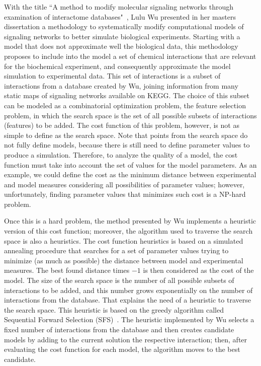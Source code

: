 With the title ``A method to modify molecular signaling networks through
examination of interactome databases"~\cite{Wu15}, Lulu Wu presented in 
her masters dissertation a methodology to systematically modify 
computational models of signaling networks to better simulate biological 
experiments. Starting with a model that does not approximate well the 
biological data, this methodology proposes to include into the model
a set of chemical interactions that are relevant for the biochemical 
experiment, and consequently approximate the model simulation to 
experimental data. This set of interactions is a subset of interactions 
from a database created by Wu, joining information from many static 
maps of signaling networks available on KEGG. The choice of this subset 
can be modeled as a combinatorial optimization problem, the feature 
selection problem, in which the search space is the set of all possible 
subsets of interactions (features) to be added. The cost function of 
this problem, however, is not as simple to define as the search space. 
Note that points from the search space do not fully define models, 
because there is still need to define parameter values to produce a 
simulation. Therefore, to analyze the quality of a model, the cost 
function must take into account the set of values for the model 
parameters. As an example, we could define the cost as the minimum 
distance between experimental and model measures considering all 
possibilities of parameter values; however, unfortunately, finding parameter values that minimizes such cost is a NP-hard problem.

Once this is a hard problem, the method presented by Wu 
implements a heuristic version of this cost function; moreover, the 
algorithm used to traverse the search space is also a heuristics. The 
cost function heuristics is based on a simulated annealing procedure 
that searches for a set of parameter values trying to minimize (as much 
as possible) the distance between model and experimental measures. The 
best found distance times $-1$ is then considered as the cost of the 
model. The size of the search space is the number of all 
possible subsets of interactions to be added, and this number grows
exponentially on the number of interactions from the database. That
explains the need of a heuristic to traverse the search space. This
heuristic is based on the greedy algorithm called Sequential Forward
Selection (SFS)~\cite{Whitney1971}. The heuristic implemented by Wu
selects a fixed number of interactions from the database and then
creates candidate models by adding to the current solution the
respective interaction; then, after evaluating the cost function for
each model, the algorithm moves to the best candidate.

